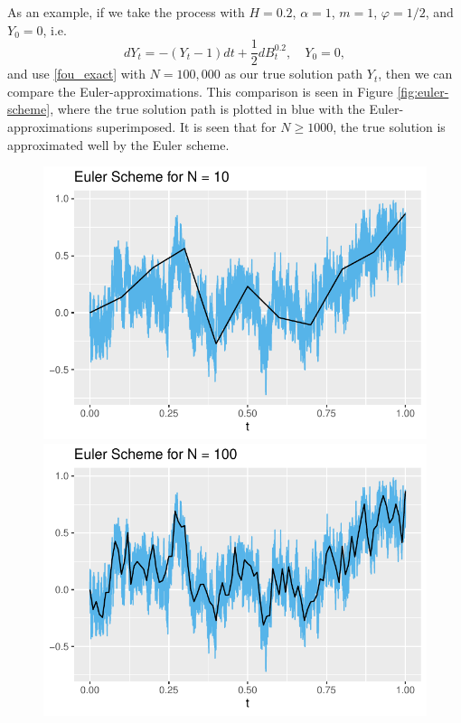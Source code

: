 As an example, if we take the process with $H=0.2$, $\alpha = 1$, $m=1$, $\varphi=1/2$, and $Y_{0}=0$, i.e.
\begin{equation}
    dY_{t}=-(Y_{t}-1)dt+\frac{1}{2}dB^{0.2}_{t},\quad Y_{0}=0,
\end{equation}
and use \eqref{fou_exact} with $N=100,000$ as our true solution path $Y_{t}$, then we can compare the Euler-approximations. This comparison is seen in Figure \ref{fig:euler-scheme}, where the true solution path is plotted in blue with the Euler-approximations superimposed. It is seen that for $N\geq 1000$, the true solution is approximated well by the Euler scheme.
\begin{figure}[H]
    \centering
    \includegraphics[scale=0.52]{fig/img/EulerScheme/EulerScheme10.pdf}
    \includegraphics[scale=0.52]{fig/img/EulerScheme/EulerScheme100.pdf}

\end{figure}
